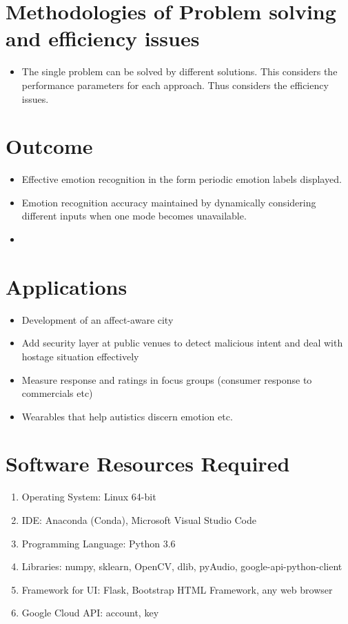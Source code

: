 \documentclass[oneside,a4paper,12pt]{report}
\begin{document}
\begin{normalsize}
\begin{itemize}
\end{itemize}
\vspace{4mm}
\section{Methodologies of Problem solving and efficiency issues}
\begin{itemize}
	\item The single problem can be solved by different solutions.  This considers the performance parameters for each approach. Thus considers the efficiency issues.
\end{itemize}
\vspace{4mm}
\section{Outcome}
\begin{itemize}
\item Effective emotion recognition in the form periodic emotion labels displayed.
\item Emotion recognition accuracy maintained by dynamically considering different inputs when one mode becomes unavailable.
\item 

\end{itemize}
\vspace{4mm}
\section{Applications}
\begin{itemize}
\item Development of an affect-aware city
\item Add security layer at public venues to detect malicious intent and deal with hostage situation effectively
\item Measure response and ratings in focus groups (consumer response to commercials etc)
\item Wearables that help autistics discern emotion etc.
\end{itemize}
\vspace{4mm}
\section{Software Resources Required}
\begin{enumerate}
	\item Operating System: Linux 64-bit
	\item IDE: Anaconda (Conda), Microsoft Visual Studio Code
	\item Programming Language: Python 3.6
	\item Libraries: numpy, sklearn, OpenCV, dlib, pyAudio, google-api-python-client
	\item Framework for UI: Flask, Bootstrap HTML Framework, any web browser
	\item Google Cloud API: account, key
\end{enumerate}
\vspace{10mm}

\end{normalsize}
\end{document}
